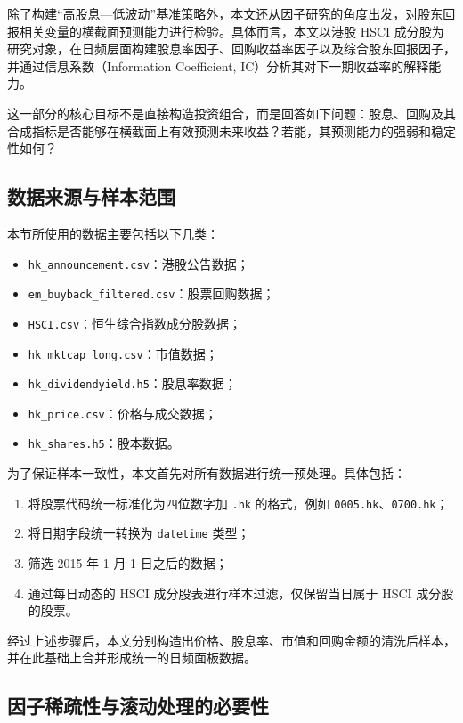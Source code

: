 \documentclass[a4paper,10pt]{article}
\begin{document}
除了构建“高股息—低波动”基准策略外，本文还从因子研究的角度出发，对股东回报相关变量的横截面预测能力进行检验。具体而言，本文以港股 HSCI 成分股为研究对象，在日频层面构建股息率因子、回购收益率因子以及综合股东回报因子，并通过信息系数（Information Coefficient, IC）分析其对下一期收益率的解释能力。

这一部分的核心目标不是直接构造投资组合，而是回答如下问题：股息、回购及其合成指标是否能够在横截面上有效预测未来收益？若能，其预测能力的强弱和稳定性如何？

\subsection{数据来源与样本范围}

本节所使用的数据主要包括以下几类：

\begin{itemize}
    \item \texttt{hk\_announcement.csv}：港股公告数据；
    \item \texttt{em\_buyback\_filtered.csv}：股票回购数据；
    \item \texttt{HSCI.csv}：恒生综合指数成分股数据；
    \item \texttt{hk\_mktcap\_long.csv}：市值数据；
    \item \texttt{hk\_dividendyield.h5}：股息率数据；
    \item \texttt{hk\_price.csv}：价格与成交数据；
    \item \texttt{hk\_shares.h5}：股本数据。
\end{itemize}

为了保证样本一致性，本文首先对所有数据进行统一预处理。具体包括：

\begin{enumerate}
    \item 将股票代码统一标准化为四位数字加 \texttt{.hk} 的格式，例如 \texttt{0005.hk}、\texttt{0700.hk}；
    \item 将日期字段统一转换为 \texttt{datetime} 类型；
    \item 筛选 2015 年 1 月 1 日之后的数据；
    \item 通过每日动态的 HSCI 成分股表进行样本过滤，仅保留当日属于 HSCI 成分股的股票。
\end{enumerate}

经过上述步骤后，本文分别构造出价格、股息率、市值和回购金额的清洗后样本，并在此基础上合并形成统一的日频面板数据。



\subsection{因子稀疏性与滚动处理的必要性}
\end{document}
